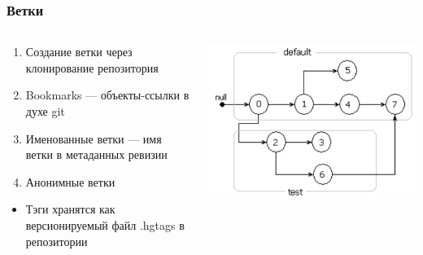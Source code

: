 \documentclass{../mcsslides}
\begin{document}
    \begin{frame}
        \frametitle{Ветки}
        \begin{columns}
            \begin{column}{0.6\textwidth}
                \begin{enumerate}
                    \item Создание ветки через клонирование репозитория
                    \item Bookmarks --- объекты-ссылки в духе git
                    \item Именованные ветки --- имя ветки в метаданных ревизии
                    \item Анонимные ветки
                \end{enumerate}
                \begin{itemize}
                    \item Тэги хранятся как версионируемый файл .hgtags в репозитории
                \end{itemize}
            \end{column}
            \begin{column}{0.4\textwidth}
                \includegraphics[width=\textwidth]{mercurialBranches.png}
            \end{column}
        \end{columns}
    \end{frame}
\end{document}
